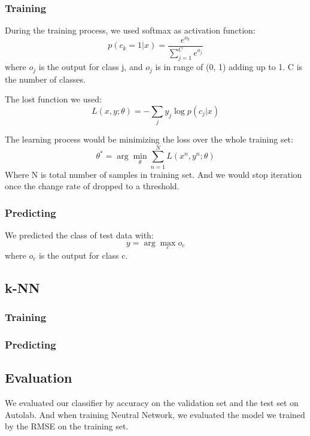 \documentclass{article} %
\begin{document}
\subsubsection{Training}
During the training process, we used softmax as activation function:
\begin{equation}
p(c_k=1|x) =  \frac{e^{o_k}}{\sum_{j=1}^{C}e^{o_j}}
\end{equation}
where $o_{j}$ is the output for class j, and $o_{j}$ is in range of (0, 1) adding up to 1. C is the number of classes. 

The lost function we used:
\begin{equation}
L(x, y; \theta) = -\sum_jy_j\log p(c_j|x)
\end{equation}

The learning process would be minimizing the loss over the whole training set:
\begin{equation}
\theta^* = \arg\min_\theta\sum_{n=1}^NL(x^n, y^n; \theta)
\end{equation}
Where N is total number of samples in training set. And we would stop iteration once the change rate of  dropped to a threshold.

\subsubsection{Predicting}
We predicted the class of test data with:
\begin{equation}
y=\arg\max_{c}o_{c}
\end{equation}
where $o_{c}$ is the output for class c.

\subsection{k-NN}
\subsubsection{Training}

\subsubsection{Predicting}

\subsection{Evaluation}

We evaluated our classifier by accuracy on the validation set and the test set on Autolab. And when training Neutral Network, we evaluated the model we trained by the RMSE on the training set.
\end{document}
